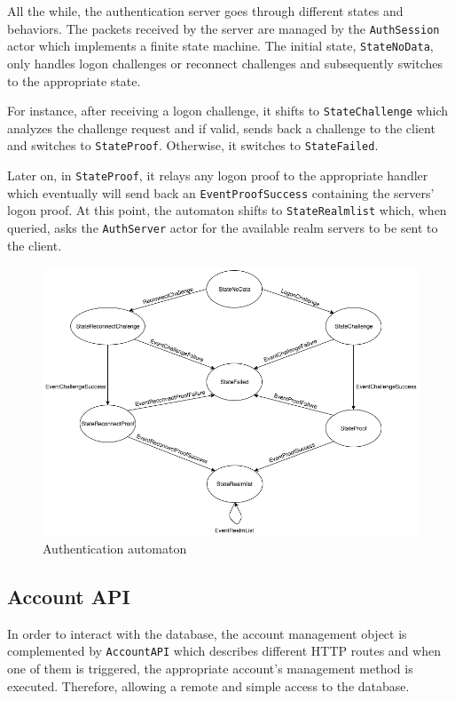 \documentclass[paper=a4, fontsize=11pt]{scrartcl}
\begin{document}
All the while, the authentication server goes through different states and
behaviors. The packets received by the server are managed by the
\texttt{AuthSession} actor which implements a finite state machine.
The initial state, \texttt{StateNoData}, only handles logon challenges or
reconnect challenges and subsequently switches to the appropriate state.

For instance, after receiving a logon challenge, it shifts
to \texttt{StateChallenge} which analyzes the challenge request and if valid, 
sends back a challenge to the client and switches to \texttt{StateProof}. 
Otherwise, it switches to \texttt{StateFailed}.

Later on, in \texttt{StateProof}, it relays any logon proof to the appropriate
handler which eventually will send back an \texttt{EventProofSuccess} containing
the servers' logon proof.
At this point, the automaton shifts to \texttt{StateRealmlist} which, when
queried, asks the \texttt{AuthServer} actor for the available realm servers to
be sent to the client.

\begin{figure}[htb!]
    \centering
    \includegraphics[width=\textwidth]{authSession}
    \caption{Authentication automaton}
\end{figure}
\subsection{Account API}

In order to interact with the database, the account management object is 
complemented by \texttt{AccountAPI} which describes different HTTP routes 
and when one of them is triggered, the appropriate account's management method is
executed. Therefore, allowing a remote and simple access to the database.
\end{document}
